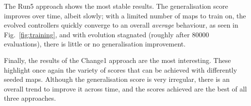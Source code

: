 \documentclass[conference]{IEEEtran}
\begin{document}
The Run5 approach shows the most stable results. The generalisation score
improves over time, albeit slowly; with a limited number of maps
to train on, the evolved controllers quickly converge to an overall
\textit{average} behaviour, as seen in Fig.~\ref{fig:training}, and with
evolution stagnated (roughly after $80000$ evaluations), there is little or no
generalisation improvement.

Finally, the results of the Change1 approach are the most interesting. These
highlight once again the variety of scores that can be achieved with
differently seeded maps. Although the generalisation score is very irregular,
there is an overall trend to improve it across time, and the scores achieved
are the best of all three approaches.





\end{document}
